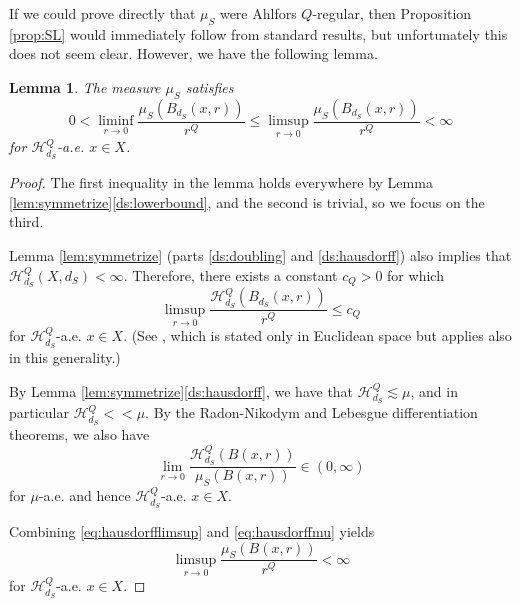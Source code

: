 \documentclass{amsart}
\theoremstyle{plain}
\newtheorem{lemma}[theorem]{Lemma}
\theoremstyle{definition}
\numberwithin{equation}{section}
\numberwithin{theorem}{section}
\begin{document}
If we could prove directly that $\mu_{S}$ were Ahlfors $Q$-regular, then Proposition \ref{prop:SL} would immediately follow from standard results, but unfortunately this does not seem clear. However, we have the following lemma. 

\begin{lemma}\label{lem:density}
The measure $\mu_S$ satisfies
$$ 0 < \liminf_{r\rightarrow 0} \frac{\mu_S(B_{d_S}(x,r))}{r^Q} \leq \limsup_{r\rightarrow 0} \frac{\mu_S(B_{d_S}(x,r))}{r^Q}  < \infty$$
for $\mathcal{H}^Q_{d_S}$-a.e. $x\in X$.
\end{lemma}
\begin{proof}
The first inequality in the lemma holds everywhere by Lemma \ref{lem:symmetrize}\eqref{ds:lowerbound}, and the second is trivial, so we focus on the third.

Lemma \ref{lem:symmetrize} (parts \eqref{ds:doubling} and \eqref{ds:hausdorff}) also implies that $\mathcal{H}^Q_{d_S}(X,d_S)<\infty$. Therefore, there exists a constant $c_Q>0$ for which 
\begin{equation}\label{eq:hausdorfflimsup}
 \limsup_{r\rightarrow 0} \frac{\mathcal{H}^Q_{d_S}(B_{d_S}(x,r))}{r^Q} \leq c_Q
\end{equation}
for $\mathcal{H}^Q_{d_S}$-a.e. $x\in X$. (See \cite[Theorem 6.2]{Mat}, which is stated only in Euclidean space but applies also in this generality.)

By Lemma \ref{lem:symmetrize}\eqref{ds:hausdorff}, we have that $\mathcal{H}^Q_{d_S} \lesssim \mu$, and in particular 
$\mathcal{H}^Q_{d_S} << \mu$. By the Radon-Nikodym and Lebesgue differentiation theorems, we also have
\begin{equation}\label{eq:hausdorffmu}
\lim_{r\rightarrow0} \frac{\mathcal{H}^Q_{d_S}(B(x,r)) }{\mu_S(B(x,r))} \in (0,\infty)
\end{equation}
for $\mu$-a.e. and hence $\mathcal{H}^Q_{d_S}$-a.e. $x\in X$.

Combining \eqref{eq:hausdorfflimsup} and \eqref{eq:hausdorffmu} yields
\[
\limsup_{r\rightarrow 0} \frac{\mu_S(B(x,r))}{r^Q} <\infty
\]
for $\mathcal{H}^Q_{d_S}$-a.e. $x\in X$.
\end{proof}
\end{document}
